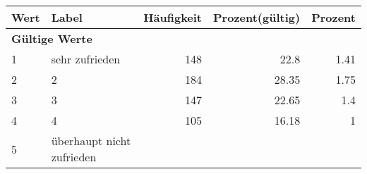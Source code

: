      \begin{longtable}{lXrrr}
     \toprule
     \textbf{Wert} & \textbf{Label} & \textbf{Häufigkeit} & \textbf{Prozent(gültig)} & \textbf{Prozent} \\
     \endhead
     \midrule
     \multicolumn{5}{l}{\textbf{Gültige Werte}}\\

     1 &
     \multicolumn{1}{X}{ sehr zufrieden   } &


       \num{148} &
       \num[round-mode=places,round-precision=2]{22,8} &
         \num[round-mode=places,round-precision=2]{1,41} \\

     2 &
     \multicolumn{1}{X}{ 2   } &


       \num{184} &
       \num[round-mode=places,round-precision=2]{28,35} &
         \num[round-mode=places,round-precision=2]{1,75} \\

     3 &
     \multicolumn{1}{X}{ 3   } &


       \num{147} &
       \num[round-mode=places,round-precision=2]{22,65} &
         \num[round-mode=places,round-precision=2]{1,4} \\

     4 &
     \multicolumn{1}{X}{ 4   } &


       \num{105} &
       \num[round-mode=places,round-precision=2]{16,18} &
         \num[round-mode=places,round-precision=2]{1} \\

     5 &
     \multicolumn{1}{X}{ überhaupt nicht zufrieden   } &



\end{longtable}
